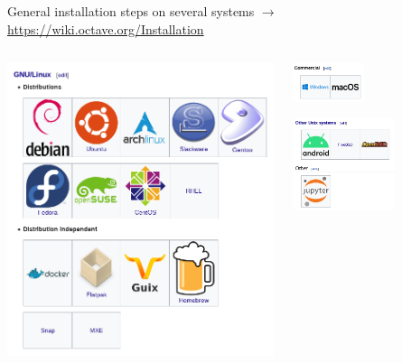\begin{frame}{General installation steps on several systems}
$\rightarrow$ \url{https://wiki.octave.org/Installation}
\bigskip
\begin{columns}
\begin{column}{0.4\textwidth}
\includegraphics[width=\textwidth]{res/images/octave_wiki_install_linux}
\end{column}
\begin{column}{0.4\textwidth}
\includegraphics[width=0.42\textwidth]{res/images/octave_wiki_install_commercial}

\includegraphics[width=0.6\textwidth]{res/images/octave_wiki_install_other}
\bigskip\bigskip\bigskip
\end{column}
\end{columns}
\end{frame}
